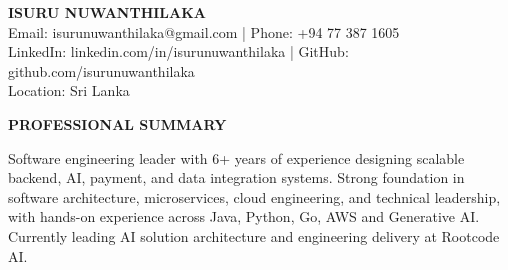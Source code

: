 \documentclass[a4paper,10pt]{article}
\newcommand{\ressection}[1]{
  \vspace{0.2em}
  \noindent\textbf{\large #1}
  \vspace{0.1em}
  \par
}
\begin{document}
\begin{center}
  {\LARGE\textbf{ISURU NUWANTHILAKA}} \\
  \vspace{0.2em}
  Email: isurunuwanthilaka@gmail.com | Phone: +94 77 387 1605 \\
  LinkedIn: linkedin.com/in/isurunuwanthilaka | GitHub: github.com/isurunuwanthilaka \\
  Location: Sri Lanka
\end{center}

\vspace{0.2em}
\ressection{PROFESSIONAL SUMMARY}
\noindent Software engineering leader with 6+ years of experience designing scalable backend, AI, payment, and data integration systems. Strong foundation in software architecture, microservices, cloud engineering, and technical leadership, with hands-on experience across Java, Python, Go, AWS and Generative AI. Currently leading AI solution architecture and engineering delivery at Rootcode AI.
\end{document}
